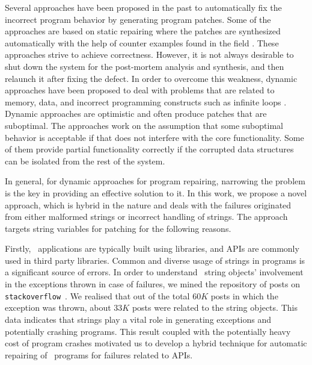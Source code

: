 Several approaches have been proposed in the past to automatically fix the
incorrect program behavior by generating program patches.
Some of the approaches are based on static repairing
where the patches are synthesized automatically with the help of counter
examples
found in the field \cite{wei-issta-2010}. These approaches strive to achieve
correctness.
However, it is not always desirable to shut down the system for the post-mortem
analysis and synthesis, and then relaunch it
after fixing the defect. In order to overcome this weakness,
dynamic approaches have been proposed to deal with problems that are
related to memory, data, and incorrect programming constructs such as infinite
loops \cite{Carbin:2011, KlingMCR12, conf/sosp/PerkinsKLABCPSSSWZER09}.
Dynamic approaches are optimistic and often produce patches that are suboptimal.
The approaches work on the
assumption that some suboptimal behavior is acceptable if that does not
interfere with the core functionality. Some of them provide
partial functionality correctly if the corrupted data structures can be isolated
from the rest of the system.

In general, for dynamic approaches for program repairing, narrowing the problem
is the key in providing an effective solution to it. In this work, we propose a
novel
approach, which is hybrid in the nature and
deals with the failures originated from either malformed strings or incorrect
handling of strings. The approach targets string variables for patching for the
following reasons.

Firstly, \java\ applications are typically built using libraries, and
 APIs
are commonly used in third party libraries. Common and diverse usage of strings
in programs is a significant source of errors. In order to understand \java\
string objects'
involvement in the exceptions thrown in case of failures, we mined the
repository of posts
on \texttt{stackoverflow}~\cite{stackoverflow}. We realised that out
of the total $60K$ posts in which the exception was thrown, about $33K$ posts
were
related to the \java string objects. This data indicates that strings play a
vital
role in generating exceptions and potentially crashing programs. This result
coupled with the potentially
heavy cost of program crashes motivated us to develop a hybrid technique for
automatic repairing of \java\ programs for failures related to \code{String}
APIs.


